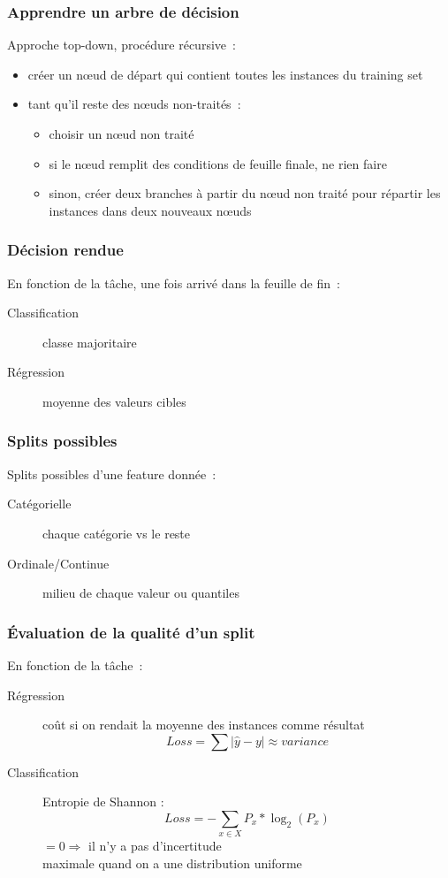 \begin{frame}
  \frametitle{Apprendre un arbre de décision}
  Approche \og top-down\fg, procédure récursive :
  \begin{itemize}[<+->]
  \item créer un nœud de départ qui contient toutes les instances du
    training set
  \item tant qu'il reste des nœuds non-traités :
    \begin{itemize}
    \item choisir un nœud non traité
    \item si le nœud remplit des conditions de feuille finale, ne rien
      faire
    \item sinon, créer deux branches à partir du nœud non traité
      pour répartir les instances dans deux nouveaux nœuds
    \end{itemize}
  \end{itemize}
\end{frame}

\begin{frame}
  \frametitle{Décision rendue}
  En fonction de la tâche, une fois arrivé dans la feuille de fin :
  \begin{description}
  \item[Classification] classe majoritaire
  \item[Régression] moyenne des valeurs cibles
  \end{description}
\end{frame}

\begin{frame}
  \frametitle{Splits possibles}
  Splits possibles d'une feature donnée :
  \begin{description}
  \item[Catégorielle] chaque catégorie vs le reste
  \item[Ordinale/Continue] milieu de chaque valeur ou
    quantiles
  \end{description}
\end{frame}

\begin{frame}
  \frametitle{Évaluation de la qualité d'un split}
  En fonction de la tâche :
  \begin{description}
  \item[Régression] coût si on rendait la moyenne des instances
    comme résultat
    \[
      Loss = \sum|\hat{y}-y| \approx variance
    \]
  \item[Classification] Entropie de Shannon :
    \[
    Loss = -\sum_{x \in X}P_x*\log_2(P_x)
    \]
    $= 0 \Rightarrow$ il n'y a pas d'incertitude \\
    maximale quand on a une distribution uniforme
  \end{description}
\end{frame}

